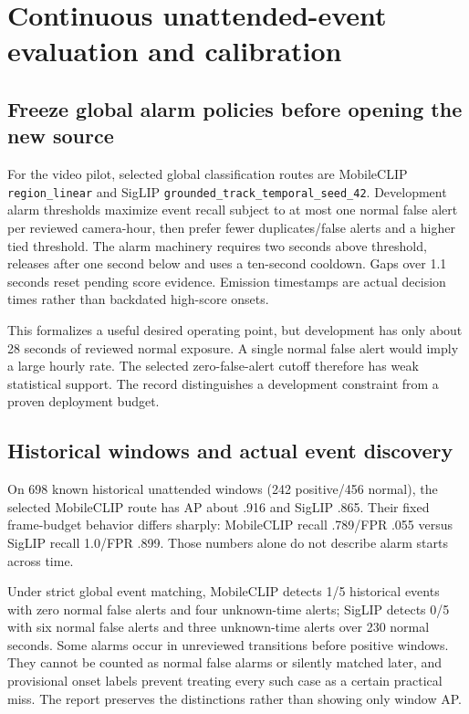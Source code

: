 \chapter{Continuous unattended-event evaluation and calibration}
\label{ch:events}
\section{Freeze global alarm policies before opening the new source}
For the video pilot, selected global classification routes are MobileCLIP \texttt{region\_linear} and SigLIP \texttt{grounded\_track\_temporal\_seed\_42}. Development alarm thresholds maximize event recall subject to at most one normal false alert per reviewed camera-hour, then prefer fewer duplicates/false alerts and a higher tied threshold. The alarm machinery requires two seconds above threshold, releases after one second below and uses a ten-second cooldown. Gaps over 1.1 seconds reset pending score evidence. Emission timestamps are actual decision times rather than backdated high-score onsets.

This formalizes a useful desired operating point, but development has only about 28 seconds of reviewed normal exposure. A single normal false alert would imply a large hourly rate. The selected zero-false-alert cutoff therefore has weak statistical support. The record distinguishes a development constraint from a proven deployment budget.

\section{Historical windows and actual event discovery}
On 698 known historical unattended windows (242 positive/456 normal), the selected MobileCLIP route has AP about .916 and SigLIP .865. Their fixed frame-budget behavior differs sharply: MobileCLIP recall .789/FPR .055 versus SigLIP recall 1.0/FPR .899. Those numbers alone do not describe alarm starts across time.

Under strict global event matching, MobileCLIP detects 1/5 historical events with zero normal false alerts and four unknown-time alerts; SigLIP detects 0/5 with six normal false alerts and three unknown-time alerts over 230 normal seconds. Some alarms occur in unreviewed transitions before positive windows. They cannot be counted as normal false alarms or silently matched later, and provisional onset labels prevent treating every such case as a certain practical miss. The report preserves the distinctions rather than showing only window AP.


